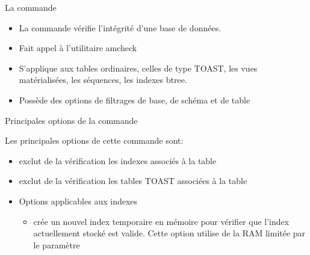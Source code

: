 
\begin{frame}[fragile]{La commande }

\begin{itemize}

   \item La commande  vérifie l'intégrité d'une base de données.
   \item Fait appel à l'utilitaire \textsf{amcheck}
   \item S'applique aux tables ordinaires, celles de type TOAST, les vues matérialisées, les séquences, les indexes btree.
   \item Possède des options de filtrages de base, de schéma et de table

\end{itemize}

\begin{toile}
\end{toile}

\end{frame}


\begin{frame}[fragile]{Principales options de la commande }

   Les principales options de cette commande sont:

\begin{itemize}

   \item {} exclut de la vérification les indexes associés à la table
   \item {} exclut de la vérification les tables TOAST associées à la table
   \item Options applicables aux indexes

   \begin{itemize}
      \item {} crée un nouvel index temporaire en mémoire pour vérifier que l'index actuellement stocké est valide. Cette option utilise de la RAM limitée par le paramètre 
   \end{itemize}
\end{itemize}

\end{frame}

